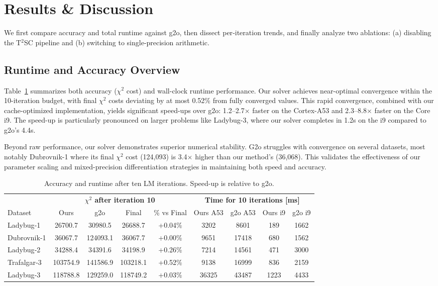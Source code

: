 \section{Results \& Discussion}
\label{sec:results}

We first compare accuracy and total runtime against g2o, then dissect 
per‑iteration trends, and finally analyze two ablations: (a) disabling the T$^{2}$SC 
pipeline and (b) switching to single‑precision arithmetic.

\subsection{Runtime and Accuracy Overview}
\label{subsec:results_runtime}
Table~\ref{tab:results_runtime} summarizes both accuracy ($\chi^{2}$ cost) and wall-clock runtime 
performance. Our solver achieves near-optimal convergence within the 10-iteration budget, with 
final $\chi^{2}$ costs deviating by at most 0.52\% from fully converged values. This rapid 
convergence, combined with our cache-optimized implementation, yields significant speed-ups over 
g2o: 1.2--2.7$\times$ faster on the Cortex-A53 and 2.3--8.8$\times$ faster on the Core i9. The 
speed-up is particularly pronounced on larger problems like Ladybug-3, where our solver completes 
in 1.2s on the i9 compared to g2o's 4.4s.

Beyond raw performance, our solver demonstrates superior numerical stability. G2o struggles with 
convergence on several datasets, most notably Dubrovnik-1 where its final $\chi^{2}$ cost 
(124,093) is 3.4$\times$ higher than our method's (36,068). This validates the effectiveness of 
our parameter scaling and mixed-precision differentiation strategies in maintaining both speed and 
accuracy.

\begin{table}[t]
\caption{Accuracy and runtime after ten LM iterations. Speed-up is relative to g2o.}
\label{tab:results_runtime}
\centering
\begin{tabular}{@{}lcccccccc@{}}
\toprule
& \multicolumn{4}{c}{\textbf{$\chi^{2}$ after iteration 10}} & \multicolumn{4}{c}{\textbf{Time for 10 iterations [ms]}} \\
\cmidrule(lr){2-5} \cmidrule(lr){6-9}
Dataset & Ours & g2o & Final & \% vs Final & Ours A53 & g2o A53 & Ours i9 & g2o i9 \\
\midrule
Ladybug‑1   & 26700.7 & 30980.5 & 26688.7 & +0.04\% & 3202 & 8601 & 189 & 1662 \\
Dubrovnik‑1 & 36067.7 & 124093.1 & 36067.7 & +0.00\% & 9651 & 17418 & 680 & 1562 \\
Ladybug‑2   & 34288.4 & 34391.6 & 34198.9 & +0.26\% & 7214 & 14561 & 471 & 3000 \\
Trafalgar‑3 & 103754.9 & 141586.9 & 103218.1 & +0.52\% & 9138 & 16999 & 836 & 2159 \\
Ladybug‑3   & 118788.8 & 129259.0 & 118749.2 & +0.03\% & 36325 & 43487 & 1223 & 4433 \\
\bottomrule
\end{tabular}
\end{table}

